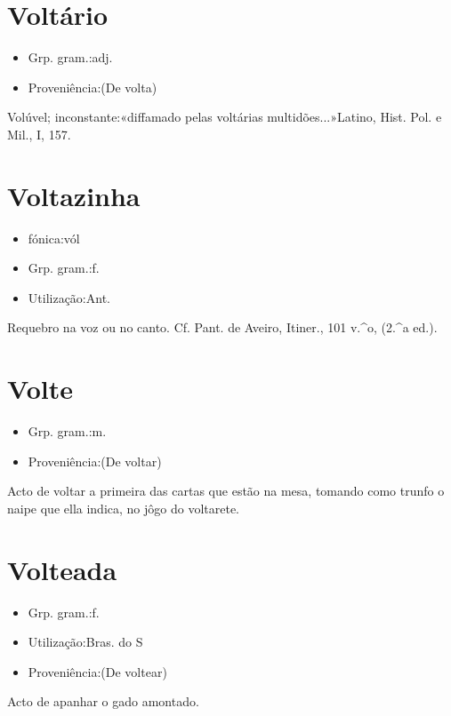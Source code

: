 \documentclass{article}
\begin{document}
\section{Voltário}
\begin{itemize}
\item {Grp. gram.:adj.}
\end{itemize}
\begin{itemize}
\item {Proveniência:(De \textunderscore volta\textunderscore )}
\end{itemize}
Volúvel; inconstante:«\textunderscore diffamado pelas voltárias multidões...\textunderscore »Latino, \textunderscore Hist. Pol. e Mil.\textunderscore , I, 157.
\section{Voltazinha}
\begin{itemize}
\item {fónica:vól}
\end{itemize}
\begin{itemize}
\item {Grp. gram.:f.}
\end{itemize}
\begin{itemize}
\item {Utilização:Ant.}
\end{itemize}
Requebro na voz ou no canto. Cf. Pant. de Aveiro, \textunderscore Itiner.\textunderscore , 101 v.^o, (2.^a ed.).
\section{Volte}
\begin{itemize}
\item {Grp. gram.:m.}
\end{itemize}
\begin{itemize}
\item {Proveniência:(De \textunderscore voltar\textunderscore )}
\end{itemize}
Acto de voltar a primeira das cartas que estão na mesa, tomando como trunfo o naipe que ella indica, no jôgo do voltarete.
\section{Volteada}
\begin{itemize}
\item {Grp. gram.:f.}
\end{itemize}
\begin{itemize}
\item {Utilização:Bras. do S}
\end{itemize}
\begin{itemize}
\item {Proveniência:(De \textunderscore voltear\textunderscore )}
\end{itemize}
Acto de apanhar o gado amontado.
\end{document}
